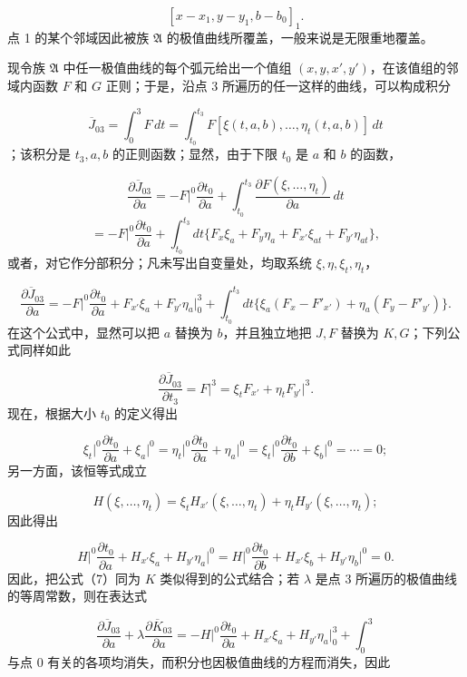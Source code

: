 \documentclass[11pt,a4paper,leqno]{article}
\begin{document}
\[
[x-x_1,y-y_1,b-b_0]_1.
\]
点 1 的某个邻域因此被族 $\mathfrak{A}$ 的极值曲线所覆盖，一般来说是无限重地覆盖。

现令族 $\mathfrak{A}$ 中任一极值曲线的每个弧元给出一个值组 $(x,y,x',y')$，在该值组的邻域内函数 $F$ 和 $G$ 正则；于是，沿点 3 所遍历的任一这样的曲线，可以构成积分

\[
\overline{J}_{03}=\int_0^3F\,dt=
\int_{t_0}^{t_3}F[\xi(t,a,b),\ldots,\eta_t(t,a,b)]\,dt
\]
；该积分是 $t_3,a,b$ 的正则函数；显然，由于下限 $t_0$ 是 $a$ 和 $b$ 的函数，

\[
\frac{\partial\overline{J}_{03}}{\partial a}
=-F\bigg|^0\frac{\partial t_0}{\partial a}+
\int_{t_0}^{t_3}\frac{\partial F(\xi,\ldots,\eta_t)}{\partial a}\,dt
\]
\[
=-F\bigg|^0\frac{\partial t_0}{\partial a}+
\int_{t_0}^{t_3}dt\{F_x\xi_a+F_y\eta_a+F_{x'}\xi_{at}+F_{y'}\eta_{at}\},
\]
或者，对它作分部积分；凡未写出自变量处，均取系统 $\xi,\eta,\xi_t,\eta_t$，

\begin{equation}\tag{7}
\frac{\partial\overline{J}_{03}}{\partial a}
=-F\bigg|^0\frac{\partial t_0}{\partial a}+
F_{x'}\xi_a+F_{y'}\eta_a\bigg|_0^3+
\int_{t_0}^{t_3}dt\{\xi_a(F_x-F'_{x'})+\eta_a(F_y-F'_{y'})\}.
\end{equation}
在这个公式中，显然可以把 $a$ 替换为 $b$，并且独立地把 $J,F$ 替换为 $K,G$；下列公式同样如此

\begin{equation}\tag{8}
\frac{\partial\overline{J}_{03}}{\partial t_3}=F\bigg|^3=\xi_tF_{x'}+\eta_tF_{y'}\bigg|^3.
\end{equation}
现在，根据大小 $t_0$ 的定义得出

\[
\xi_t\bigg|^0\frac{\partial t_0}{\partial a}+\xi_a\bigg|^0
=\eta_t\bigg|^0\frac{\partial t_0}{\partial a}+\eta_a\bigg|^0
=\xi_t\bigg|^0\frac{\partial t_0}{\partial b}+\xi_b\bigg|^0=\cdots=0;
\]
另一方面，该恒等式成立

\[
H(\xi,\ldots,\eta_t)=\xi_tH_{x'}(\xi,\ldots,\eta_t)+\eta_tH_{y'}(\xi,\ldots,\eta_t);
\]
因此得出

\begin{equation}\tag{9}
H\bigg|^0\frac{\partial t_0}{\partial a}+H_{x'}\xi_a+H_{y'}\eta_a\bigg|^0
=H\bigg|^0\frac{\partial t_0}{\partial b}+H_{x'}\xi_b+H_{y'}\eta_b\bigg|^0=0.
\end{equation}
因此，把公式（7）同为 $K$ 类似得到的公式结合；若 $\lambda$ 是点 3 所遍历的极值曲线的等周常数，则在表达式

\[
\frac{\partial\overline{J}_{03}}{\partial a}+\lambda\frac{\partial\overline{K}_{03}}{\partial a}
=-H\bigg|^0\frac{\partial t_0}{\partial a}+H_{x'}\xi_a+H_{y'}\eta_a\bigg|_0^3+\int_0^3
\]
与点 0 有关的各项均消失，而积分也因极值曲线的方程而消失，因此
\end{document}
